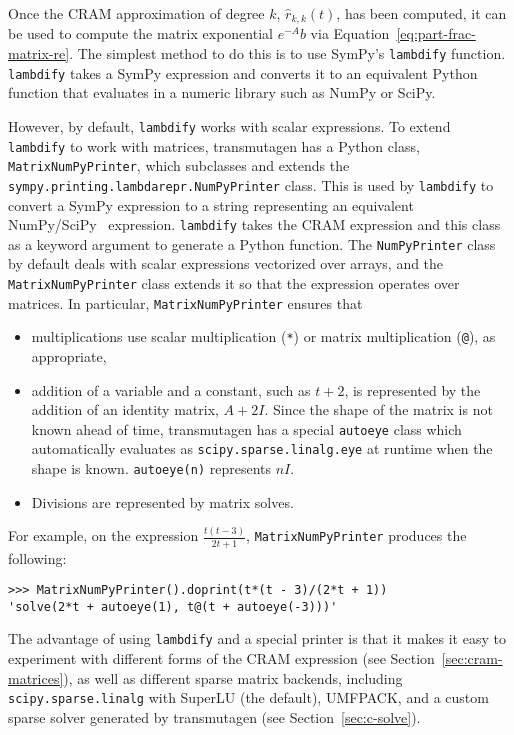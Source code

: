 Once the CRAM approximation of degree $k$, $\hat{r}_{k, k}(t)$, has been
computed, it can be used to compute the matrix exponential $e^{-A}b$ via
Equation~\ref{eq:part-frac-matrix-re}. The simplest method to do this is to
use SymPy's \texttt{lambdify} function. \texttt{lambdify} takes a SymPy
expression and converts it to an equivalent Python function that evaluates in a
numeric library such as NumPy or SciPy.

However, by default, \texttt{lambdify} works with scalar expressions. To
extend \texttt{lambdify} to work with matrices, transmutagen has a Python
class, \texttt{MatrixNumPyPrinter}, which subclasses and extends the
\texttt{sympy.\allowbreak{}printing.\allowbreak{}lambdarepr.\allowbreak{}NumPyPrinter}
class. This is used by \texttt{lambdify} to convert a SymPy expression to a
string representing an equivalent NumPy/SciPy~\cite{ationneeded} expression.
\texttt{lambdify} takes the CRAM expression and this class as a keyword
argument to generate a Python function. The \texttt{NumPyPrinter} class by
default deals with scalar expressions vectorized over arrays, and the
\texttt{MatrixNumPyPrinter} class extends it so that the expression operates
over matrices. In particular, \texttt{MatrixNumPyPrinter} ensures that

\begin{itemize}
\item multiplications use scalar multiplication (\texttt{*}) or
  matrix multiplication (\texttt{@}), as appropriate,
\item addition of a variable and a constant, such as $t + 2$, is represented
  by the addition of an identity matrix, $A + 2I$. Since the shape of the
  matrix is not known ahead of time, transmutagen has a special
  \texttt{autoeye} class which automatically evaluates as
  \texttt{scipy.\allowbreak{}sparse.\allowbreak{}linalg.\allowbreak{}eye} at
  runtime when the shape is known. \texttt{autoeye(n)} represents $nI$.
\item Divisions are represented by matrix solves.
\end{itemize}

For example, on the expression $\frac{t \left(t - 3\right)}{2 t + 1}$,
\texttt{MatrixNumPyPrinter} produces the following:
\begin{verbatim}
>>> MatrixNumPyPrinter().doprint(t*(t - 3)/(2*t + 1))
'solve(2*t + autoeye(1), t@(t + autoeye(-3)))'
\end{verbatim}

The advantage of using \texttt{lambdify} and a special printer is that it
makes it easy to experiment with different forms of the CRAM expression (see
Section~\ref{sec:cram-matrices}), as well as different sparse matrix backends,
including \texttt{scipy.\allowbreak{}sparse.\allowbreak{}linalg} with SuperLU
(the default), UMFPACK, and a custom sparse solver generated by transmutagen
(see Section~\ref{sec:c-solve}).
